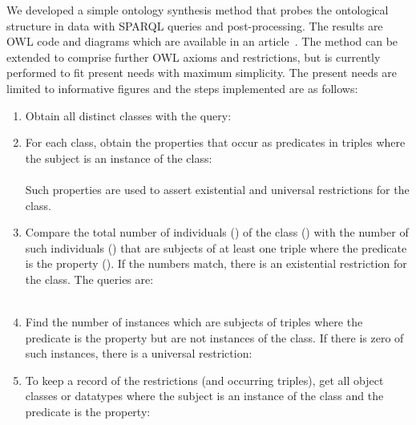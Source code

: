 We developed a simple ontology synthesis method that probes
the ontological structure in data with
SPARQL queries and post-processing.
The results are OWL code and diagrams which are 
available in an article~\cite{losd}.
The method can be extended to comprise further OWL axioms and restrictions,
but is currently performed to fit present needs with maximum simplicity.
The present needs are limited to informative figures and
the steps implemented are as follows:
\begin{enumerate}[leftmargin=0cm]
\item Obtain all distinct classes with the query:\\
\item For each class, obtain the properties that occur as predicates in triples where the subject is an instance of the class:\\
\\
Such properties are used to assert existential and universal restrictions for the class.
\item Compare the total number of individuals () of the class () with
the number of such individuals () that are subjects of at least one triple where 
the predicate is the property ().
If the numbers match, there is an existential restriction for the class. The queries are:\\
\\
\item Find the number of instances which are subjects of triples where the predicate is the property but are not instances of the class.
If there is zero of such instances, there is a universal restriction:\\
\item To keep a record of the restrictions (and occurring triples), get all object classes or datatypes where the subject is an instance of the class and the predicate is the property:\\

\end{enumerate}

